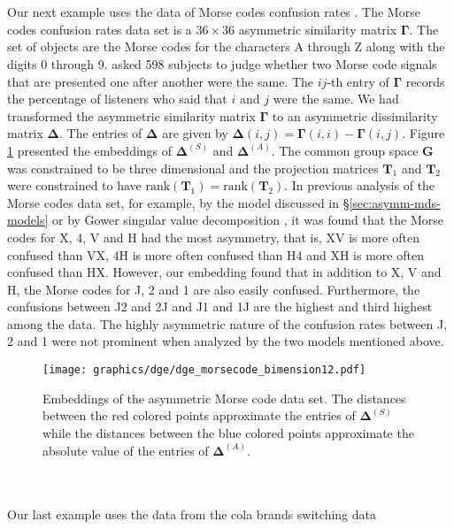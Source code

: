 \documentclass[11pt]{asaproc}
\begin{document}
\\ \\ \noindent Our next example uses the data of Morse codes
confusion rates \citep{rothkopf57}. The Morse codes confusion rates
data set is a $36 \times 36$ asymmetric similarity matrix
$\bm{\Gamma}$. The set of objects are the Morse codes for the
characters A through Z along with the digits 0 through
9. \citet{rothkopf57} asked 598 subjects to judge whether two Morse
code signals that are presented one after another were the same. The
$ij$-th entry of $\bm{\Gamma}$ records the percentage of listeners who
said that $i$ and $j$ were the same. We had transformed the asymmetric
similarity matrix $\bm{\Gamma}$ to an asymmetric dissimilarity matrix
$\bm{\Delta}$. The entries of $\bm{\Delta}$ are given by
$\bm{\Delta}(i,j) = \bm{\Gamma}(i,i) - \bm{\Gamma}(i,j)$. Figure
\ref{fig:morsecode} presented the embeddings of $\bm{\Delta}^{(S)}$
and $\bm{\Delta}^{(A)}$. The common group space $\mathbf{G}$ was
constrained to be three dimensional and the projection matrices
$\mathbf{T}_1$ and $\mathbf{T}_2$ were constrained to have
$\mathrm{rank}(\mathbf{T}_1) = \mathrm{rank}(\mathbf{T}_2)$. In
previous analysis of the Morse codes data set, for example, by the
model discussed in \S \ref{sec:asymm-mds-models} or by Gower singular
value decomposition \citet{gower77:_recen}, it was found that the
Morse codes for X, 4, V and H had the most asymmetry, that is, XV is
more often confused than VX, 4H is more often confused than H4 and XH
is more often confused than HX. However, our embedding found that in
addition to X, V and H, the Morse codes for J, 2 and 1 are also easily
confused. Furthermore, the confusions between J2 and 2J and J1 and 1J
are the highest and third highest among the data. The highly
asymmetric nature of the confusion rates between J, 2 and 1 were not
prominent when analyzed by the two models mentioned above.
\begin{figure}[htbp]
  \centering
    \texttt{[image: graphics/dge/dge\_morsecode\_bimension12.pdf]}
    \caption{Embeddings of the asymmetric Morse code data set. The
      distances between the red colored points approximate the entries
      of $\bm{\Delta}^{(S)}$ while the distances between the blue
      colored points approximate the absolute value of the entries of
      $\bm{\Delta}^{(A)}$.}
  \label{fig:morsecode}
\end{figure}
\\ \\
\noindent
Our last example uses the data from the cola brands switching data
\end{document}
